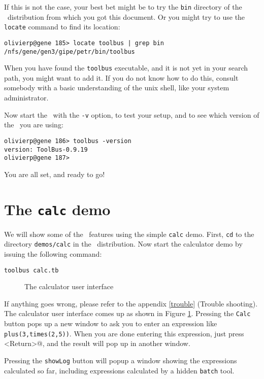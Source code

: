 \documentclass[a4paper,twoside]{article} %
\begin{document}
If this is not the case, your best bet might be to try the {\tt bin}
directory of the \TB\ distribution from which you got this document.
Or you might try to use the {\tt locate} command
to find its location:
\begin{verbatim}
olivierp@gene 185> locate toolbus | grep bin
/nfs/gene/gen3/gipe/petr/bin/toolbus
\end{verbatim}

When you have found the {\tt toolbus} executable, and it is not yet
in your search path, you might want to add it. If you do not know how
to do this, consult somebody with a basic understanding of the
unix shell, like your system administrator.

Now start the \TB\ with the {\tt -v} option, to test your setup,
and to see which version of the \TB\ you are using:

\begin{verbatim}
olivierp@gene 186> toolbus -version
version: ToolBus-0.9.19
olivierp@gene 187>
\end{verbatim}

You are all set, and ready to go!

\section{The {\tt calc} demo}

We will show some of the \TB\ features using the simple {\tt calc} demo.
First, {\tt cd} to the directory {\tt demos/calc} in the \TB\ distribution.
Now start the calculator demo by issuing the following command:

\begin{verbatim}
toolbus calc.tb
\end{verbatim}

\begin{figure}[htb]
\centerline{}
\caption{The calculator user interface}
\label{calc-ui}
\end{figure}

If anything goes wrong, please refer to the appendix 
\ref{trouble} (Trouble shooting).
The calculator user interface comes up as shown in Figure \ref{calc-ui}.
Pressing the {\tt Calc} button pops up a new window to ask you to enter
an expression like {\tt plus(3,times(2,5))}.
When you are done entering this expression, just press 
\verb@<Return>@, and the result will pop up in another window.

Pressing the {\tt showLog} button will popup a window showing the
expressions calculated so far, including expressions calculated
by a hidden {\tt batch} tool.
\end{document}
